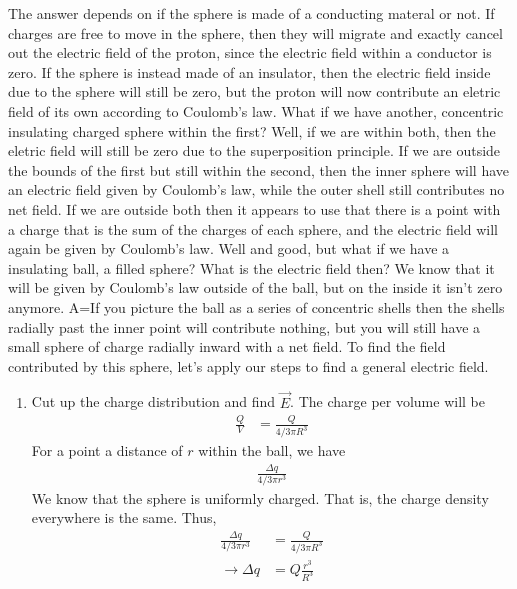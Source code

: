 \documentclass[nobib]{tufte-handout}
\begin{document}
The answer depends on if the sphere is made of a conducting materal or not. If charges are free
to move in the sphere, then they will migrate and exactly cancel out the electric field of 
the proton, since the electric field within a conductor is zero. If the sphere is instead 
made of an insulator, then the electric field inside due to the sphere will still be zero, 
but the proton will now contribute an eletric field of its own according to Coulomb's law. 
What if we have another, concentric insulating charged sphere within the first? Well, if we 
are within both, then the eletric field will still be zero due to the superposition 
principle. If we are outside the bounds of the first but still within the second, then the inner
sphere will have an electric field given by Coulomb's law, while the outer shell still contributes no 
net field. If we are outside both then it appears to use that there is a point with a charge 
that is the sum of the charges of each sphere, and the electric field will again be given by Coulomb's law. 
Well and good, but what if we have a insulating ball, a filled sphere? What is the electric field then?
We know that it will be given by Coulomb's law outside of the ball, but on the inside 
it isn't zero anymore. A=If you picture the ball as a series of concentric shells then the 
shells radially past the inner point will contribute nothing, but you will still have a 
small sphere of charge radially inward with a net field. To find the field contributed by this sphere, 
let's apply our steps to find a general electric field. 
\begin{enumerate}
    \item Cut up the charge distribution and find $\vec{E}$. 
    The charge per volume will be 
    \begin{align*}
        \frac{Q}{V} &= \frac{Q}{4/3 \pi R^3}
    \end{align*}
    For a point a distance of $r$ within the ball, we have 
    \begin{align*}
        \frac{\Delta q}{4/3 \pi r^3} 
    \end{align*}
    We know that the sphere is uniformly charged. That is, the charge density everywhere is the same. 
    Thus, 
    \begin{align*}
        \frac{\Delta q}{4/3 \pi r^3} &= \frac{Q}{4/3 \pi R^3} \\
        \rightarrow \Delta q &= Q\frac{r^3}{R^3}
    \end{align*}
\end{enumerate}
\end{document}
